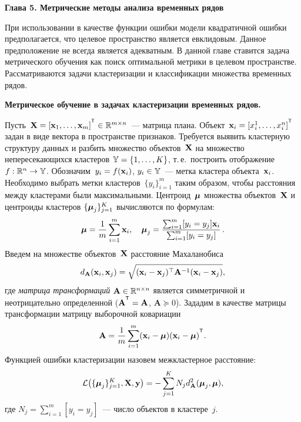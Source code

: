 \documentclass[11pt, a5paper]{dissert}
\begin{document}
\textbf{Глава 5. Метрические методы анализа временных рядов}
\label{ch:metric_learning}

При использовании в качестве функции ошибки модели квадратичной ошибки предполагается, что целевое пространство является евклидовым. 
Данное предположение не всегда является адекватным.
В данной главе ставится задача метрического обучения как поиск оптимальной метрики в целевом пространстве.
Рассматриваются задачи кластеризации и классификации множества временных рядов.

\textbf{Метрическое обучение в задачах кластеризации временных рядов.}
\label{sec:ch5:metric_learning_clustering}

Пусть~$\bX = [\bx_1, \dots, \bx_m]^{\T} \in \mathbb{R}^{m \times n}$~--- матрица плана.
Объект~$\bx_i = [x_i^1, \ldots, x_i^n]^{\T}$ задан в виде вектора в пространстве признаков.
Требуется выявить кластерную структуру данных и разбить множество объектов~$\mathbf{X}$ на множество непересекающихся кластеров $\mathbb{Y} = \{1, \dots, K\}$,
т.\,е.\ построить отображение $f: \mathbb{R}^n \to \mathbb{Y}$.
Обозначим~$y_i = f (\mathbf{x}_i)$, $y_i \in \mathbb{Y}$~--- метка кластера объекта~$\mathbf{x}_i$.
Необходимо выбрать метки кластеров~$\{y_i\}_{i=1}^m$ таким образом, чтобы расстояния между кластерами были максимальными.
Центроид~$\boldsymbol{\mu}$ множества объектов~$\mathbf{X}$ и центроиды кластеров $\{\boldsymbol{\mu}_j\}_{j=1}^K$ вычисляются по формулам:
\begin{equation}
	\label{ch5:eq:mu}
	\boldsymbol{\mu} =\frac{1}{m} \sum_{i=1}^m\mathbf{x}_i, \quad
	\boldsymbol{\mu}_j =\frac{ \sum_{i=1}^m [y_i = y_j]\mathbf{x}_i } {\sum_{i=1}^m [y_i = y_j]}\,.
\end{equation}
Введем на множестве объектов~$\mathbf{X}$ расстояние Махаланобиса
\begin{equation}
	d_{\mathbf{A}} (\mathbf{x}_i, \mathbf{x}_j) = \sqrt{(\mathbf{x}_i - \mathbf{x}_j)^{\top} \mathbf{A}^{-1} (\mathbf{x}_i - \mathbf{x}_j)},
	\label{ch5:eq:mahal_distance}
\end{equation}
где \textit{матрица трансформаций} $\mathbf{A} \in \mathbb{R}^{n \times n}$ является симметричной и неотрицательно определенной ($\mathbf{A}^{\T} = \mathbf{A}$, $\mathbf{A} \succeq 0$).
Зададим в качестве матрицы трансформации матрицу выборочной ковариации
\begin{equation}
	\label{ch5:eq:covMatrix}
	\bA = \frac{1}{m} \sum_{i=1}^m(\bx_i - \bmu)(\bx_i - \bmu)^{\T}.
\end{equation}
Функцией ошибки кластеризации назовем межкластерное расстояние:
\begin{equation}
	\mathcal{L} \bigl(\{\boldsymbol{\mu}_j\}_{j=1}^K, \mathbf{X}, \mathbf{y}\bigr)= - \sum_{j=1}^K N_j d_{\mathbf{A}}^2(\boldsymbol{\mu}_j, \boldsymbol{\mu}),
	\label{ch5:eq:cluster_error_function}
\end{equation}
где $N_j = \sum_{i=1}^m [y_i = y_j]$~--- число объектов в кластере~$j$.
\end{document}

